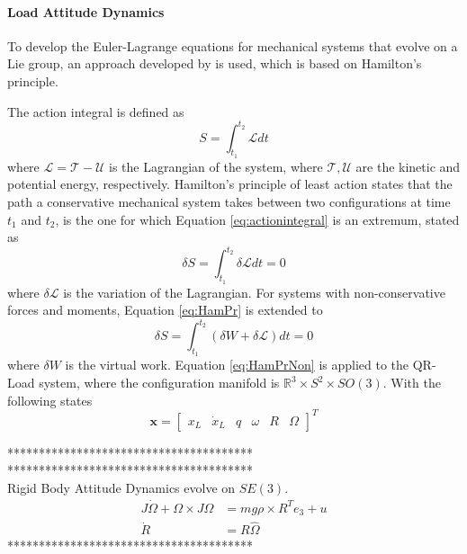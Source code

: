 \paragraph{Load Attitude Dynamics}
To develop the Euler-Lagrange equations for mechanical systems that evolve on a Lie group, an approach developed by \cite{Lee2008,Lee2005,Lee2009,Lee2011} is used, which is based on Hamilton's principle. 

The action integral is defined as
\begin{equation}\label{eq:actionintegral}
S=\int_{t_1}^{t_2}\mathcal{L}dt
\end{equation}
where $\mathcal{L}=\mathcal{T}-\mathcal{U} $ is the Lagrangian of the system, where $\mathcal{T},\mathcal{U}$ are the kinetic and potential energy, respectively. Hamilton's principle of least action states that the path a conservative mechanical system takes between two configurations at time $ t_1 $ and $ t_2 $, is the one for which Equation \ref{eq:actionintegral} is an extremum, stated as
\begin{equation}\label{eq:HamPr}
\delta S=\int_{t_1}^{t_2}\delta\mathcal{L}dt=0
\end{equation}
where $ \delta\mathcal{L} $ is the variation of the Lagrangian. For systems with non-conservative forces and moments, Equation \ref{eq:HamPr} is extended to
\begin{equation}\label{eq:HamPrNon}
\delta S=\int_{t_1}^{t_2}(\delta W+\delta\mathcal{L})dt=0
\end{equation}
where $ \delta W $ is the virtual work. Equation \ref{eq:HamPrNon} is applied to the QR-Load system, where the configuration manifold is $ \mathbb{R}^3\times S^2\times SO(3) $. With the following states
\begin{equation}\label{key}
\textbf{x}= \begin{bmatrix}x_L& \dot{x}_L& q& \omega&R&\Omega
\end{bmatrix}^T
\end{equation}


***************************************\\

***************************************\\
Rigid Body Attitude Dynamics evolve on $ SE(3) $.
\begin{align}\label{eq:eomrigidbody}
J\dot{\Omega}+\Omega\times J\Omega &= mg\rho\times R^Te_3+u\\ 
\dot{R} &= R\hat{\Omega}
\end{align}
***************************************\\


